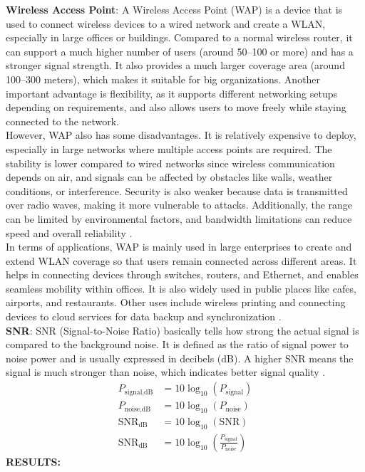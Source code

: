 \documentclass[a4paper,12pt]{article}
\begin{document}
\noindent
\textbf{Wireless Access Point}: A Wireless Access Point (WAP) is a device that is used to connect wireless devices to a wired network and create a WLAN, especially in large offices or buildings. Compared to a normal wireless router, it can support a much higher number of users (around 50–100 or more) and has a stronger signal strength. It also provides a much larger coverage area (around 100–300 meters), which makes it suitable for big organizations. Another important advantage is flexibility, as it supports different networking setups depending on requirements, and also allows users to move freely while staying connected to the network\cite{wap_gfg}.\\

\noindent
However, WAP also has some disadvantages. It is relatively expensive to deploy, especially in large networks where multiple access points are required. The stability is lower compared to wired networks since wireless communication depends on air, and signals can be affected by obstacles like walls, weather conditions, or interference. Security is also weaker because data is transmitted over radio waves, making it more vulnerable to attacks. Additionally, the range can be limited by environmental factors, and bandwidth limitations can reduce speed and overall reliability \cite{wap_gfg}.\\

\noindent
In terms of applications, WAP is mainly used in large enterprises to create and extend WLAN coverage so that users remain connected across different areas. It helps in connecting devices through switches, routers, and Ethernet, and enables seamless mobility within offices. It is also widely used in public places like cafes, airports, and restaurants. Other uses include wireless printing and connecting devices to cloud services for data backup and synchronization \cite{wap_gfg}. \\

\noindent
\textbf{SNR}: SNR (Signal-to-Noise Ratio) basically tells how strong the actual signal is compared to the background noise. It is defined as the ratio of signal power to noise power and is usually expressed in decibels (dB). A higher SNR means the signal is much stronger than noise, which indicates better signal quality \cite{snr_wikipedia}.\\

\begin{align}
P_{\text{signal,dB}} &= 10 \log_{10}(P_{\text{signal}}) \\
P_{\text{noise,dB}}  &= 10 \log_{10}(P_{\text{noise}}) \\
\text{SNR}_{\text{dB}} &= 10 \log_{10}(\text{SNR}) \\
\text{SNR}_{\text{dB}} &= 10 \log_{10}\left(\frac{P_{\text{signal}}}{P_{\text{noise}}}\right)
\end{align}
\noindent
\textbf{RESULTS:}
\end{document}
